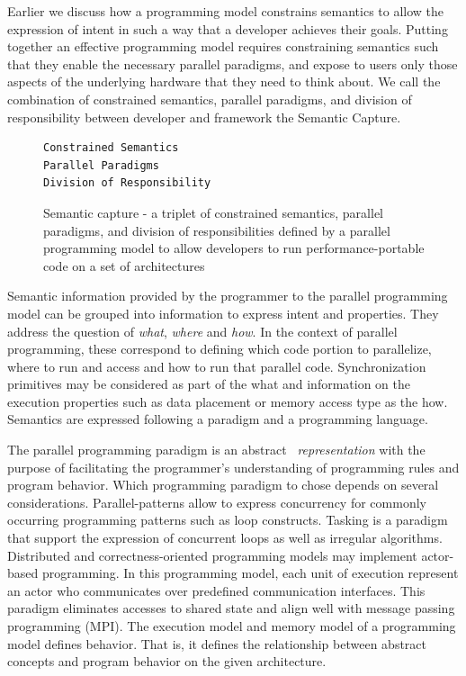Earlier we discuss how a programming model constrains semantics to allow the expression of intent in such a way that a developer achieves their goals. Putting together an effective programming model requires constraining semantics such that they enable the necessary parallel paradigms, and expose to users only those aspects of the underlying hardware that they need to think about. We call the combination of constrained semantics, parallel paradigms, and division of responsibility between developer and framework the Semantic Capture.

\begin{figure}[h]
\begin{Verbatim}[frame=leftline]
Constrained Semantics
Parallel Paradigms 
Division of Responsibility
\end{Verbatim}
\caption{Semantic capture - a triplet of constrained semantics, parallel paradigms, and division of responsibilities defined by a parallel programming model to allow developers to run performance-portable code on a set of architectures}
\label{figSemCapture}
\end{figure}

Semantic information provided by the programmer to the parallel programming model can be grouped into information to express intent and properties. They address the question of \emph{what}, \emph{where} and \emph{how}. In the context of parallel programming, these correspond to defining which code portion to parallelize, where to run and access and how to run that parallel code. Synchronization primitives may be considered as part of the what and information on the execution properties such as data placement or memory access type as the how. Semantics are expressed following a paradigm and a programming language.

The parallel programming paradigm is an abstract ~\emph{representation} with the purpose of facilitating the programmer's understanding of programming rules and program behavior. Which programming paradigm to chose depends on several considerations. Parallel-patterns allow to express concurrency for commonly occurring programming patterns such as loop constructs. Tasking is a paradigm that support the expression of concurrent loops as well as irregular algorithms. Distributed and correctness-oriented programming models may implement actor-based programming. In this programming model, each unit of execution represent an actor who communicates over predefined communication interfaces. This paradigm eliminates accesses to shared state and align well with message passing programming (MPI). The execution model and memory model of a programming model defines behavior. That is, it defines the relationship between abstract concepts and program behavior on the given architecture.

